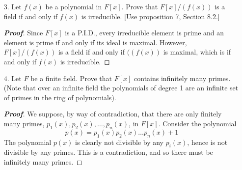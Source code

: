 \documentclass[12pt,leqno]{book}
\theoremstyle{definition}
\newenvironment{Proof}{\begin{proof}[\textnormal{\textbf{Proof}}]}{\end{proof}}
\begin{document}
\begin{enumerate}
 \item [3.] Let $f(x)$ be a polynomial in $F[x]$. Prove that $F[x]/(f(x))$ is a field if and only if $f(x)$ is irreducible. [Use proposition 7, Section 8.2.]

\begin{Proof}
 Since $F[x]$ is a P.I.D., every irreducible element is prime and an element is prime if and only if its ideal is maximal. However, $F[x]/(f(x))$ is a field if and only if $((f(x))$ is maximal, which is if and only if $f(x)$ is irreducible.
\end{Proof}

 \item [4.] Let $F$ be a finite field. Prove that $F[x]$ contains infinitely many primes. (Note that over an infinite field the polynomials of degree 1 are an infinite set of primes in the ring of polynomials).

\begin{Proof}
 We suppose, by way of contradiction, that there are only finitely many primes, $p_1(x),p_2(x),\hdots,p_n(x)$, in $F[x]$. Consider the polynomial \[p(x)=p_1(x)p_2(x)\hdots p_n(x)+1\] The polynomial $p(x)$ is clearly not divisible by any $p_i(x)$, hence is not divisible by any primes. This is a contradiction, and so there must be infinitely many primes.
\end{Proof}

\end{enumerate}
\end{document}
